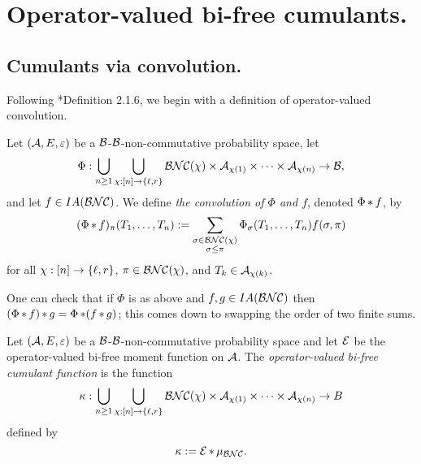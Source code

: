 
		\section{Operator-valued bi-free cumulants.}
		\label{sec:operatorvaluedbifreecumulants}






		\subsection{Cumulants via convolution.}
		Following \cite{speicher1998combinatorial}*{Definition 2.1.6}, we begin with a definition of operator-valued convolution.

		\begin{definition}
			Let $(\mathcal{A}, E, \varepsilon)$ be a $\mathcal{B}$-$\mathcal{B}$-non-commutative probability space, let
			\[
				\Phi : \bigcup_{n\geq 1} \bigcup_{\chi : [n] \to \left\{\ell, r\right\}} \mathcal{BNC}(\chi) \times \mathcal{A}_{\chi(1)} \times \cdots \times \mathcal{A}_{\chi(n)} \to \mathcal{B},
			\]
			and let $f \in IA(\mathcal{BNC})$.
			We define \emph{the convolution of $\Phi$ and $f$}, denoted $\Phi \mathop{\ast} f$, by
			\[
				(\Phi \mathop{\ast} f)_\pi(T_1, \ldots, T_n) := \sum_{\substack{\sigma \in \mathcal{BNC}(\chi)\\ \sigma \leq \pi}} \Phi_\sigma(T_1,\ldots, T_n) f(\sigma, \pi)
			\]
			for all $\chi : [n] \to \left\{\ell, r\right\}$, $\pi \in \mathcal{BNC}(\chi)$, and $T_k \in \mathcal{A}_{\chi(k)}$.
		\end{definition}

		One can check that if $\Phi$ is as above and $f,g \in IA(\mathcal{BNC})$ then $(\Phi \mathop{\ast} f) \mathop{\ast} g = \Phi \mathop{\ast} (f \mathop{\ast} g)$; this comes down to swapping the order of two finite sums.

		\begin{definition}
			\label{def:kappa}
			Let $(\mathcal{A}, E, \varepsilon)$ be a $\mathcal{B}$-$\mathcal{B}$-non-commutative probability space and let $\mathcal{E}$ be the operator-valued bi-free moment function on $\mathcal{A}$.
			The \emph{operator-valued bi-free cumulant function} is the function
			\[
				\kappa : \bigcup_{n\geq 1} \bigcup_{\chi : [n] \to \left\{\ell, r\right\}} \mathcal{BNC}(\chi) \times \mathcal{A}_{\chi(1)} \times \cdots \times \mathcal{A}_{\chi(n)} \to B
			\]
			defined by
			\[
				\kappa := \mathcal{E} \mathop{\ast} \mu_{\mathcal{BNC}}.
			\]
		\end{definition}

